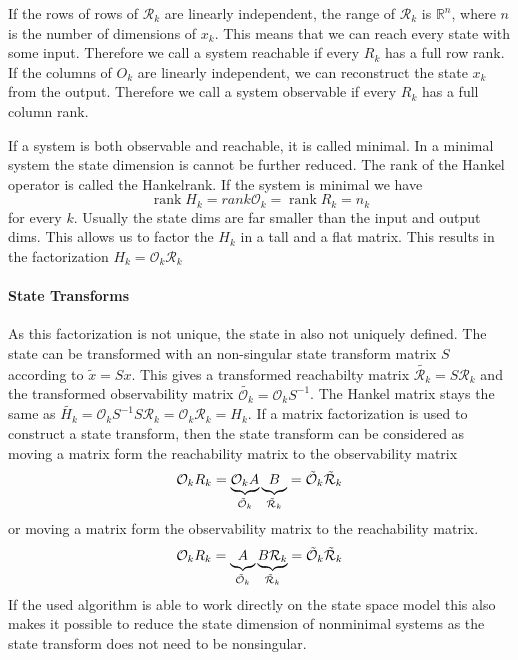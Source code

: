 \documentclass[doctype=mastersthesis,BCOR=15mm,biblatex]{ldvbook}%
\DeclareMathOperator{\rank}{rank}
\newcommand{\R}{\mathcal{R}} %
\newcommand{\Ob}{\mathcal{O}} %
\begin{document}
If the rows  of rows of $\R_k$ are linearly independent, the range of $\R_k$ is $\mathbb{R}^n$, where $n$ is the number of dimensions of $x_k$.
This means that we can reach every state with some input.
Therefore we call a system reachable if every $R_k$ has a full row rank.
If the columns of $O_k$ are linearly independent, we can reconstruct the state $x_k$ from the output.  
Therefore we call a system observable if every $R_k$ has a full column rank.

If a system is both observable and reachable, it is called minimal.
In a minimal system the state dimension is cannot be further reduced.
The rank of the Hankel operator is called the Hankelrank. 
If the system is minimal we have 
\begin{equation}
	\rank{H_k} = rank{\Ob_k} = \rank{R_k} = n_k
\end{equation}
for every $k$.
Usually the state dims are far smaller than the input and output dims.
This allows us to factor the $H_k$ in a tall and a flat matrix. 
This results in the factorization $H_k = \Ob_k\R_k$

\paragraph{State Transforms}
As this factorization is not unique, the state in also not uniquely defined. 
The state can be transformed with an non-singular state transform matrix $S$ according to $\tilde{x} =Sx$.
This gives a transformed 
reachabilty matrix $\tilde{\R_k}=S \R_k$ and the transformed
observability matrix $\tilde{\Ob_k}= \Ob_k S^{-1}$. 
The Hankel matrix stays the same as $\tilde{H_k} = \Ob_k S^{-1} S \R_k= \Ob_k \R_k = H_k$.
If a matrix factorization is used to construct a state transform, then the state transform can be considered as moving a matrix form the reachability matrix to the observability matrix
\begin{equation}
	\Ob_{k}R_{k} = \underbrace{\Ob_{k}A}_{\tilde{\Ob}_k}\underbrace{B\vphantom{\Ob_k}}_{\tilde{\R}_k} = \tilde{\Ob}_k\tilde{\R}_k
\end{equation}
or moving a matrix form the observability matrix to the reachability matrix.
\begin{equation}
\Ob_{k}R_{k} = \underbrace{A\vphantom{\R_k}}_{\tilde{\Ob}_k}\underbrace{B\R_{k}}_{\tilde{\R}_k} = \tilde{\Ob}_k\tilde{\R}_k
\end{equation}
If the used algorithm is able to work directly on the state space model this also makes it possible to reduce the state dimension of nonminimal systems as the state transform does not need to be nonsingular.
\end{document}
